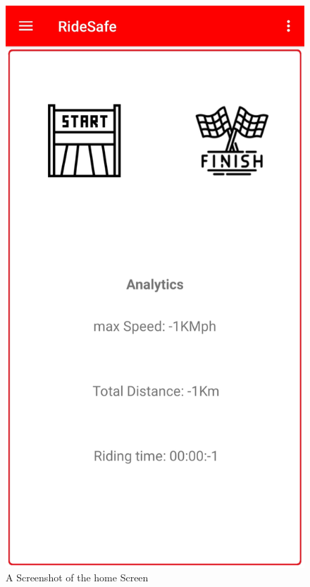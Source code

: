 \begin{figure}
\begin{center}
\includegraphics[scale = 0.15] {implementation/home.jpg}
\end{center}
\caption{A Screenshot of the home Screen}
\label{homescreen}
\end{figure}


